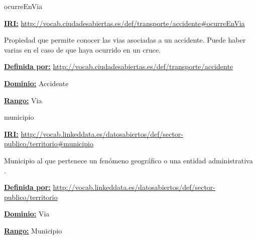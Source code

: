 \begin{mybox}{ocurreEnVia}
\begin{flushleft}
\underline{\textbf{IRI:}}
\url{http://vocab.ciudadesabiertas.es/def/transporte/accidente#ocurreEnVia}
\newline

Propiedad que permite conocer las vias asociadas a un accidente. Puede haber varias en el caso de que haya ocurrido en un cruce.

\underline{\textbf{Definida por:}}\newline
\url{http://vocab.ciudadesabiertas.es/def/transporte/accidente}
\newline

\underline{\textbf{Dominio:}} Accidente
\newline

\underline{\textbf{Rango:}} Via
\newline

\end{flushleft}
\end{mybox}





\begin{mybox}{municipio}
\begin{flushleft}
\underline{\textbf{IRI:}}
\url{http://vocab.linkeddata.es/datosabiertos/def/sector-publico/territorio#municipio}
\newline

Municipio al que pertenece un fenómeno geográfico o una entidad administrativa  \cite{datoabiertos_municipio}.
\newline

\underline{\textbf{Definida por:}}\newline
\url{http://vocab.linkeddata.es/datosabiertos/def/sector-publico/territorio}
\newline

\underline{\textbf{Dominio:}}		Via
\newline

\underline{\textbf{Rango:}}		Municipio

\end{flushleft}
\end{mybox}



